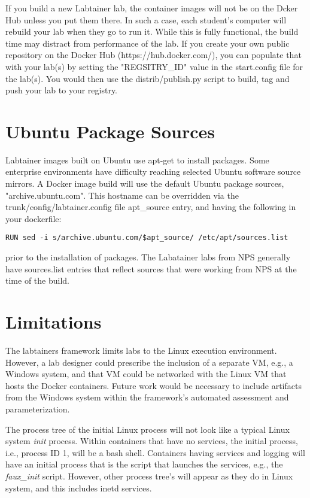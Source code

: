 \documentclass[12pt]{article}
\begin{document}
If you build a new Labtainer lab, the container images will not be on the Dcker Hub unless you put
them there.  In such a case, each student's computer will rebuild your lab when they go to run it.
While this is fully functional, the build time may distract from performance of the lab.  If you
create your own public repository on the Docker Hub (https://hub.docker.com/), you can populate that
with your lab(s) by setting the "REGSITRY\_ID" value in the start.config file for the lab(s). You
would then use the distrib/publish.py script to build, tag and push your lab to your registry.

\section{Ubuntu Package Sources}
Labtainer images built on Ubuntu use apt-get to install packages.  Some enterprise environments have 
difficulty reaching selected Ubuntu software source mirrors.  A Docker image build will use the default 
Ubuntu package sources, "archive.ubuntu.com".  This hostname can be overridden via the 
trunk/config/labtainer.config file apt\_source entry, and having the following in your dockerfile:
\begin{verbatim}
RUN sed -i s/archive.ubuntu.com/$apt_source/ /etc/apt/sources.list
\end{verbatim}
\noindent prior to the installation of packages.  The Labatainer labs from NPS 
generally have sources.list entries that reflect sources that were working from NPS at the time of the build.
 
\section{Limitations}
The labtainers framework limits labs to the Linux execution environment.
However, a lab designer could prescribe the inclusion of a separate
VM, e.g., a Windows system, and that VM could be networked with the Linux
VM that hosts the Docker containers.  Future work would be necessary to include
artifacts from the Windows system within the framework's automated assessment
and parameterization.

The process tree of the initial Linux process will
not look like a typical Linux system \textit{init} process.  Within containers that have no
services, the initial process, i.e., process ID 1, will be a bash shell.
Containers having services and logging will have an initial process that is
the script that launches the services, e.g., the \textit{faux\_init} script.  However,
other process tree's will appear as they
do in Linux system, and this includes inetd services.
\end{document}
